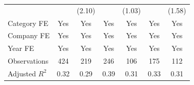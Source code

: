 {\begin{tabular}{l*{6}{c}}
                                   &                     &      (2.10)         &                     &      (1.03)         &                     &      (1.58)         \\
[1em]
Category FE                        &         Yes         &         Yes         &         Yes         &         Yes         &         Yes         &         Yes         \\
[1em]
Company FE                         &         Yes         &         Yes         &         Yes         &         Yes         &         Yes         &         Yes         \\
[1em]
Year FE                            &         Yes         &         Yes         &         Yes         &         Yes         &         Yes         &         Yes         \\
\hline
Observations                       &         424         &         219         &         246         &         106         &         175         &         112         \\
Adjusted \(R^{2}\)                 &        0.32         &        0.29         &        0.39         &        0.31         &        0.33         &        0.31         \\
\hline\hline
\end{tabular}
}
